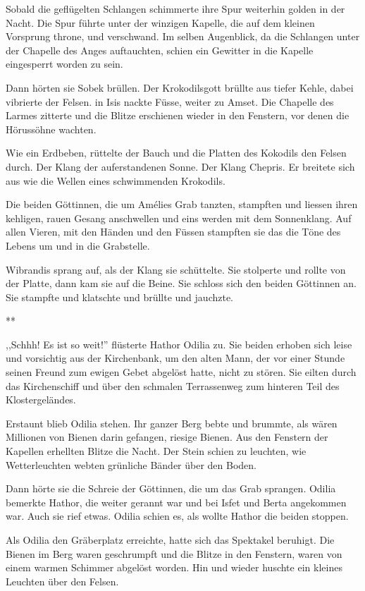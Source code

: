 \documentclass[11pt,titlepage,a5paper]{book}
\newcommand{\sterne}{\par{\centering ***\par}}
\begin{document}
Sobald die geflügelten Schlangen schimmerte ihre Spur weiterhin golden in der Nacht. Die Spur führte unter der winzigen Kapelle, die auf dem kleinen Vorsprung throne, und verschwand. Im selben Augenblick, da die Schlangen unter der Chapelle des Anges auftauchten, schien ein Gewitter in die Kapelle eingesperrt worden zu sein. 

Dann hörten sie Sobek brüllen. Der Krokodilsgott brüllte aus tiefer Kehle, dabei vibrierte der Felsen. in Isis nackte Füsse, weiter zu Amset. Die Chapelle des Larmes zitterte und die Blitze erschienen wieder in den Fenstern, vor denen die Hörussöhne wachten. 

Wie ein Erdbeben, rüttelte der Bauch und die Platten des Kokodils den Felsen durch. Der Klang der auferstandenen Sonne. Der Klang Chepris. Er breitete sich aus wie die Wellen eines schwimmenden Krokodils.

Die beiden Göttinnen, die um Amélies Grab tanzten, stampften und liessen ihren kehligen, rauen Gesang anschwellen und eins werden mit dem Sonnenklang. Auf allen Vieren, mit den Händen und den Füssen stampften sie das die Töne des Lebens um und in die Grabstelle.

Wibrandis sprang auf, als der Klang sie schüttelte. Sie stolperte und rollte von der Platte, dann kam sie auf die Beine. Sie schloss sich den beiden Göttinnen an. Sie stampfte und klatschte und brüllte und jauchzte. 

\sterne

,,Schhh! Es ist so weit!'' flüsterte Hathor Odilia zu. Sie beiden erhoben sich leise und vorsichtig aus der Kirchenbank, um den alten Mann, der vor einer Stunde seinen Freund zum ewigen Gebet abgelöst hatte, nicht zu stören.
 Sie eilten durch das Kirchenschiff und über den schmalen Terrassenweg zum hinteren Teil des Klostergeländes. 
 
Erstaunt blieb Odilia stehen. Ihr ganzer Berg bebte und brummte, als wären Millionen von Bienen darin gefangen, riesige Bienen. Aus den Fenstern der Kapellen erhellten Blitze die Nacht. Der Stein schien zu leuchten, wie Wetterleuchten webten grünliche Bänder über den Boden.

Dann hörte sie die Schreie der Göttinnen, die um das Grab sprangen. Odilia bemerkte Hathor, die weiter gerannt war und bei Isfet und Berta angekommen war. Auch sie rief etwas. Odilia schien es, als wollte Hathor die beiden stoppen.

Als Odilia den Gräberplatz erreichte, hatte sich das Spektakel beruhigt. Die Bienen im Berg waren geschrumpft und die Blitze in den Fenstern, waren von einem warmen Schimmer abgelöst worden. Hin und wieder huschte ein kleines Leuchten über den Felsen.
\end{document}

